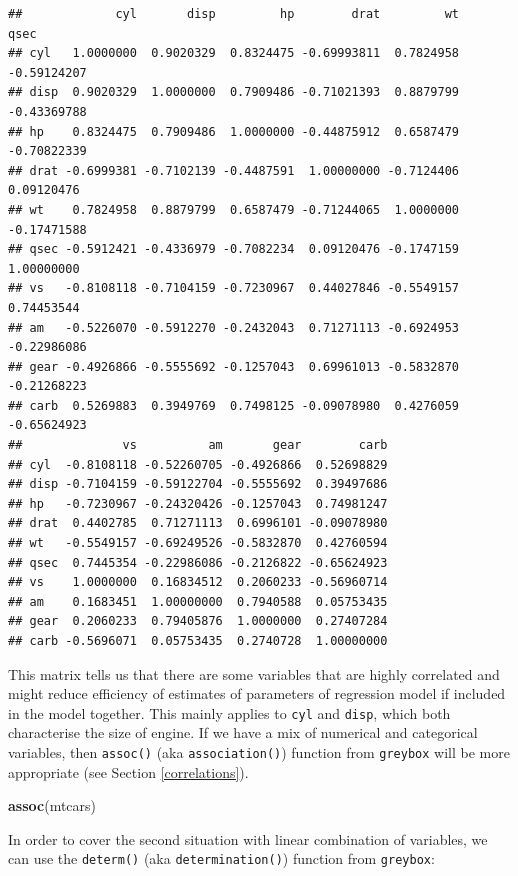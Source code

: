 \documentclass[
]{book}
\newenvironment{Shaded}{\begin{snugshade}}{\end{snugshade}}
\newcommand{\FunctionTok}[1]{\textcolor[rgb]{0.13,0.29,0.53}{\textbf{#1}}}
\newcommand{\NormalTok}[1]{#1}
\theoremstyle{definition}
\theoremstyle{definition}
\theoremstyle{definition}
\theoremstyle{definition}
\theoremstyle{remark}
\begin{document}
\begin{verbatim}
##             cyl       disp         hp        drat         wt        qsec
## cyl   1.0000000  0.9020329  0.8324475 -0.69993811  0.7824958 -0.59124207
## disp  0.9020329  1.0000000  0.7909486 -0.71021393  0.8879799 -0.43369788
## hp    0.8324475  0.7909486  1.0000000 -0.44875912  0.6587479 -0.70822339
## drat -0.6999381 -0.7102139 -0.4487591  1.00000000 -0.7124406  0.09120476
## wt    0.7824958  0.8879799  0.6587479 -0.71244065  1.0000000 -0.17471588
## qsec -0.5912421 -0.4336979 -0.7082234  0.09120476 -0.1747159  1.00000000
## vs   -0.8108118 -0.7104159 -0.7230967  0.44027846 -0.5549157  0.74453544
## am   -0.5226070 -0.5912270 -0.2432043  0.71271113 -0.6924953 -0.22986086
## gear -0.4926866 -0.5555692 -0.1257043  0.69961013 -0.5832870 -0.21268223
## carb  0.5269883  0.3949769  0.7498125 -0.09078980  0.4276059 -0.65624923
##              vs          am       gear        carb
## cyl  -0.8108118 -0.52260705 -0.4926866  0.52698829
## disp -0.7104159 -0.59122704 -0.5555692  0.39497686
## hp   -0.7230967 -0.24320426 -0.1257043  0.74981247
## drat  0.4402785  0.71271113  0.6996101 -0.09078980
## wt   -0.5549157 -0.69249526 -0.5832870  0.42760594
## qsec  0.7445354 -0.22986086 -0.2126822 -0.65624923
## vs    1.0000000  0.16834512  0.2060233 -0.56960714
## am    0.1683451  1.00000000  0.7940588  0.05753435
## gear  0.2060233  0.79405876  1.0000000  0.27407284
## carb -0.5696071  0.05753435  0.2740728  1.00000000
\end{verbatim}

This matrix tells us that there are some variables that are highly correlated and might reduce efficiency of estimates of parameters of regression model if included in the model together. This mainly applies to \texttt{cyl} and \texttt{disp}, which both characterise the size of engine. If we have a mix of numerical and categorical variables, then \texttt{assoc()} (aka \texttt{association()}) function from \texttt{greybox} will be more appropriate (see Section \ref{correlations}).

\begin{Shaded}
\begin{Highlighting}[]
\FunctionTok{assoc}\NormalTok{(mtcars)}
\end{Highlighting}
\end{Shaded}

In order to cover the second situation with linear combination of variables, we can use the \texttt{determ()} (aka \texttt{determination()}) function from \texttt{greybox}:
\end{document}
